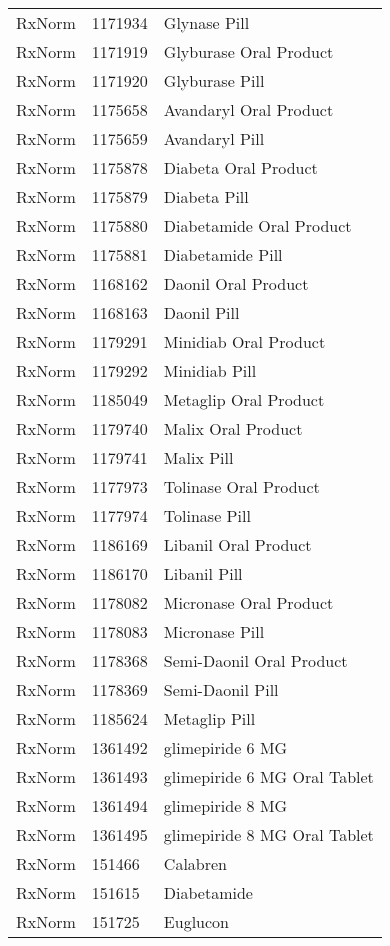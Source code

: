 \begin{longtable}{p{}p{}p{}}
  RxNorm & 1171934 & Glynase Pill \\ 
  RxNorm & 1171919 & Glyburase Oral Product \\ 
  RxNorm & 1171920 & Glyburase Pill \\ 
  RxNorm & 1175658 & Avandaryl Oral Product \\ 
  RxNorm & 1175659 & Avandaryl Pill \\ 
  RxNorm & 1175878 & Diabeta Oral Product \\ 
  RxNorm & 1175879 & Diabeta Pill \\ 
  RxNorm & 1175880 & Diabetamide Oral Product \\ 
  RxNorm & 1175881 & Diabetamide Pill \\ 
  RxNorm & 1168162 & Daonil Oral Product \\ 
  RxNorm & 1168163 & Daonil Pill \\ 
  RxNorm & 1179291 & Minidiab Oral Product \\ 
  RxNorm & 1179292 & Minidiab Pill \\ 
  RxNorm & 1185049 & Metaglip Oral Product \\ 
  RxNorm & 1179740 & Malix Oral Product \\ 
  RxNorm & 1179741 & Malix Pill \\ 
  RxNorm & 1177973 & Tolinase Oral Product \\ 
  RxNorm & 1177974 & Tolinase Pill \\ 
  RxNorm & 1186169 & Libanil Oral Product \\ 
  RxNorm & 1186170 & Libanil Pill \\ 
  RxNorm & 1178082 & Micronase Oral Product \\ 
  RxNorm & 1178083 & Micronase Pill \\ 
  RxNorm & 1178368 & Semi-Daonil Oral Product \\ 
  RxNorm & 1178369 & Semi-Daonil Pill \\ 
  RxNorm & 1185624 & Metaglip Pill \\ 
  RxNorm & 1361492 & glimepiride 6 MG \\ 
  RxNorm & 1361493 & glimepiride 6 MG Oral Tablet \\ 
  RxNorm & 1361494 & glimepiride 8 MG \\ 
  RxNorm & 1361495 & glimepiride 8 MG Oral Tablet \\ 
  RxNorm & 151466 & Calabren \\ 
  RxNorm & 151615 & Diabetamide \\ 
  RxNorm & 151725 & Euglucon \\ 

\end{longtable}
